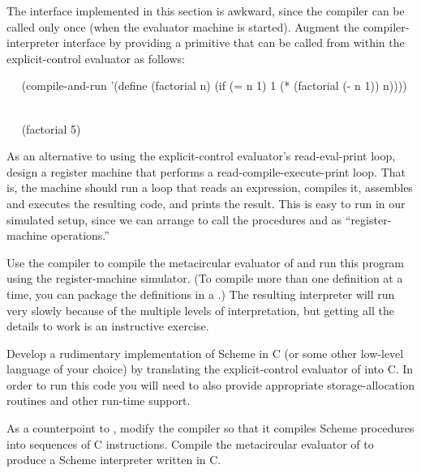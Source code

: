\begin{exercise}
	\label{Exercise 5.48}
	The  interface implemented in this section is awkward, since the compiler can be called only once (when the evaluator machine is started).
	Augment the compiler-interpreter interface by providing a  primitive that can be called from within the explicit-control evaluator as follows:
	\begin{scheme}
	  ~~
	  (compile-and-run
	   '(define (factorial n)
	      (if (= n 1) 1 (* (factorial (- n 1)) n))))
	  ~~
	  ~~

	  ~~
	  (factorial 5)
	  ~~
	  ~~
	\end{scheme}
\end{exercise}



\begin{exercise}
	\label{Exercise 5.49}
	As an alternative to using the explicit-control evaluator’s read-eval-print loop, design a register machine that performs a read-compile-execute-print loop.
	That is, the machine should run a loop that reads an expression, compiles it, assembles and executes the resulting code, and prints the result.
	This is easy to run in our simulated setup, since we can arrange to call the procedures  and  as “register-machine operations.”
\end{exercise}



\begin{exercise}
	\label{Exercise 5.50}
	Use the compiler to compile the metacircular evaluator of  and run this program using the register-machine simulator.
	(To compile more than one definition at a time, you can package the definitions in a .)
	The resulting interpreter will run very slowly because of the multiple levels of interpretation, but getting all the details to work is an instructive exercise.
\end{exercise}



\begin{exercise}
	\label{Exercise 5.51}
	Develop a rudimentary implementation of Scheme in C (or some other low-level language of your choice) by translating the explicit-control evaluator of  into C.
	In order to run this code you will need to also provide appropriate storage-allocation routines and other run-time support.
\end{exercise}



\begin{exercise}
	\label{Exercise 5.52}
	As a counterpoint to , modify the compiler so that it compiles Scheme procedures into sequences of C instructions.
	Compile the metacircular evaluator of  to produce a Scheme interpreter written in C.
\end{exercise}
